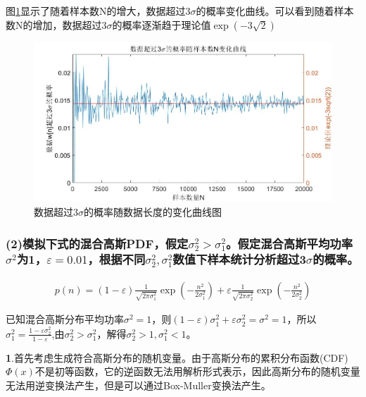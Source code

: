 \documentclass[fontset=windows]{article}
\numberwithin{figure}{section}
\begin{document}
图\ref*{fig:2}显示了随着样本数N的增大，数据超过\(3\sigma\)的概率变化曲线。可以看到随着样本数N的增加，数据超过\(3\sigma\)的概率逐渐趋于理论值\(\exp(-3\sqrt{2})\)
\begin{figure}[H]
	\centering
	\includegraphics[scale=0.35]{2.jpg}
	\caption{数据超过\(3\sigma\)的概率随数据长度的变化曲线图}
	\label{fig:2}
\end{figure}

\subsubsection*{(2)模拟下式的混合高斯PDF，假定\(\sigma^2_2>\sigma^2_1\)。假定混合高斯平均功率\(\sigma^2\)为1，\(\varepsilon=0.01\)，根据不同\(\sigma^2_2,\sigma^2_1\)数值下样本统计分析超过3\(\sigma\)的概率。}
\begin{align*}
	p(n)=(1-\varepsilon)\frac{1}{\sqrt{2\pi \sigma^2_1}}\exp\left(-\frac{n^2}{2\sigma^2_1}\right)+
	\varepsilon \frac{1}{\sqrt{2\pi \sigma^2_2}}\exp\left(-\frac{n^2}{2\sigma^2_2}\right)
\end{align*}

已知混合高斯分布平均功率\(\sigma^2=1\)，则\((1-\varepsilon)\sigma^2_1+\varepsilon\sigma^2_2=\sigma^2=1\)，所以\(\sigma^2_1=\frac{1-\varepsilon\sigma^2_2}{1-\varepsilon}\),由\(\sigma^2_2>\sigma^2_1\)，解得\(\sigma^2_2>1,\sigma^2_1<1\)。

\textbf{1}.首先考虑生成符合高斯分布的随机变量。由于高斯分布的累积分布函数(CDF)\(\Phi(x)\)不是初等函数，它的逆函数无法用解析形式表示，因此高斯分布的随机变量无法用逆变换法产生，但是可以通过Box-Muller变换法产生。
\end{document}
